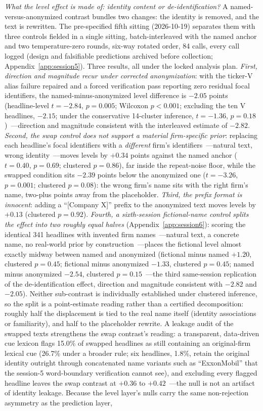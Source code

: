 \emph{What the level effect is made of: identity content or de-identification?} A named-versus-anonymized contrast bundles two changes: the identity is removed, and the text is rewritten. The pre-specified fifth sitting (2026-10-19) separates them with three controls fielded in a single sitting, batch-interleaved with the named anchor and two temperature-zero rounds, six-way rotated order, 84 calls, every call logged (design and falsifiable predictions archived before collection; Appendix~\ref{app:session5}). Three results, all under the locked analysis plan. \emph{First, direction and magnitude recur under corrected anonymization}: with the ticker-V alias failure repaired and a forced verification pass reporting zero residual focal identifiers, the named-minus-anonymized level difference is $-2.05$ points (headline-level $t=-2.84$, $p=0.005$; Wilcoxon $p<0.001$; excluding the ten V headlines, $-2.15$; under the conservative 14-cluster inference, $t=-1.36$, $p=0.18$)~---direction and magnitude consistent with the interleaved estimate of $-2.82$. \emph{Second, the swap control does not support a material firm-specific prior}: replacing each headline's focal identifiers with a \emph{different} firm's identifiers~---natural text, wrong identity~---moves levels by $+0.34$ points against the named anchor ($t=0.40$, $p=0.69$; clustered $p=0.86$), far inside the repeat-noise floor, while the swapped condition sits $-2.39$ points below the anonymized one ($t=-3.26$, $p=0.001$; clustered $p=0.08$): the wrong firm's name sits with the right firm's name, two-plus points away from the placeholder. \emph{Third, the prefix format is innocent}: adding a ``[Company X]'' prefix to the anonymized text moves levels by $+0.13$ (clustered $p=0.92$). \emph{Fourth, a sixth-session fictional-name control splits the effect into two roughly equal halves} (Appendix~\ref{app:session6}): scoring the identical 341 headlines with invented firm names~---natural text, a concrete name, no real-world prior by construction~---places the fictional level almost exactly midway between named and anonymized (fictional minus named $+1.20$, clustered $p=0.45$; fictional minus anonymized $-1.33$, clustered $p=0.45$; named minus anonymized $-2.54$, clustered $p=0.15$~---the third same-session replication of the de-identification effect, direction and magnitude consistent with $-2.82$ and $-2.05$). Neither sub-contrast is individually established under clustered inference, so the split is a point-estimate reading rather than a certified decomposition: roughly half the displacement is tied to the real name itself (identity associations or familiarity), and half to the placeholder rewrite. A leakage audit of the swapped texts strengthens the swap contrast's reading: a transparent, data-driven cue lexicon flags 15.0\% of swapped headlines as still containing an original-firm lexical cue (26.7\% under a broader rule; six headlines, 1.8\%, retain the original identity outright through concatenated name variants such as ``ExxonMobil'' that the session-5 word-boundary verification cannot see), and excluding every flagged headline leaves the swap contrast at $+0.36$ to $+0.42$~---the null is not an artifact of identity leakage. Because the level layer's nulls carry the same non-rejection asymmetry as the prediction layer, 